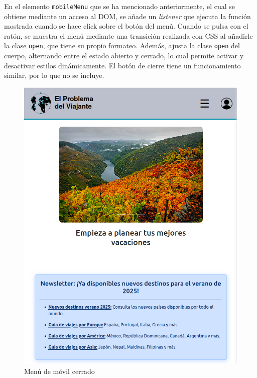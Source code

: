 \documentclass[11pt, a4paper]{book}
\begin{document}
	En el elemento \texttt{mobileMenu} que se ha mencionado anteriormente, el cual se obtiene mediante un acceso al DOM, se añade un \textit{listener} que ejecuta la función mostrada cuando se hace click sobre el botón del menú. Cuando se pulsa con el ratón, se muestra el menú mediante una transición realizada con CSS al añadirle la clase \texttt{open}, que tiene su propio formateo. Además, ajusta la clase \texttt{open} del cuerpo, alternando entre el estado abierto y cerrado, lo cual permite activar y desactivar estilos dinámicamente. El botón de cierre tiene un funcionamiento similar, por lo que no se incluye.
	
	\begin{figure} [H]
		\centering
		\includegraphics[height=0.4\textheight]{CSS/1-5 768.png}
		\caption{Menú de móvil cerrado}
	\end{figure}
\end{document}
